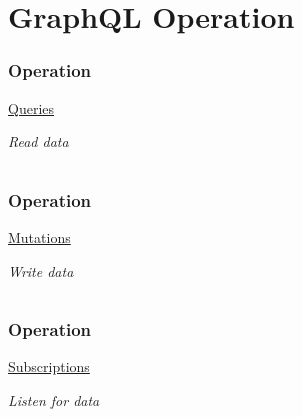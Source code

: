 \documentclass[12pt,xcolor=table]{beamer}
\begin{document}
\section{GraphQL Operation}

\begin{frame}
\frametitle{Operation}
\underline{Queries}

\scriptsize\textit{Read data}
\inputminted{bash}{code/query.text}
\end{frame}

\begin{frame}
\frametitle{Operation}
\underline{Mutations}

\scriptsize\textit{Write data}
\inputminted{bash}{code/mutation.text}

\end{frame}

\begin{frame}
\frametitle{Operation}
\underline{Subscriptions}

\scriptsize\textit{Listen for data}
\inputminted{bash}{code/subscribe.text}
\end{frame}
\end{document}
